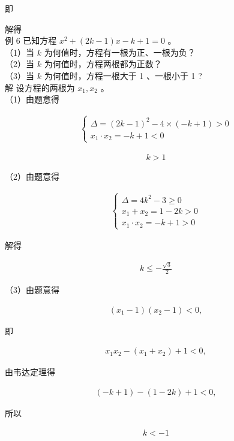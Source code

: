 \documentclass[10pt]{article}
\begin{document}
即

解得\\
例 6 已知方程 $x^{2}+(2 k-1) x-k+1=0$ 。\\
（1）当 $k$ 为何值时，方程有一根为正、一根为负？\\
（2）当 $k$ 为何值时，方程两根都为正数？\\
（3）当 $k$ 为何值时，方程一根大于 1 、一根小于 1 ?\\
解 设方程的两根为 $x_{1}, x_{2}$ 。\\
（1）由题意得

\begin{align*}
\left\{\begin{array}{l}
\Delta=(2 k-1)^{2}-4 \times(-k+1)>0 \\
x_{1} \cdot x_{2}=-k+1<0
\end{array}\right.
\end{align*}

\begin{align*}
k>1
\end{align*}

（2）由题意得

\begin{align*}
\left\{\begin{array}{l}
\Delta=4 k^{2}-3 \geqslant 0 \\
x_{1}+x_{2}=1-2 k>0 \\
x_{1} \cdot x_{2}=-k+1>0
\end{array}\right.
\end{align*}

解得

\begin{align*}
k \leqslant-\frac{\sqrt{3}}{2}
\end{align*}

（3）由题意得

\begin{align*}
\left(x_{1}-1\right)\left(x_{2}-1\right)<0,
\end{align*}

即

\begin{align*}
x_{1} x_{2}-\left(x_{1}+x_{2}\right)+1<0,
\end{align*}

由韦达定理得

\begin{align*}
(-k+1)-(1-2 k)+1<0,
\end{align*}

所以

\begin{align*}
k<-1
\end{align*}
\end{document}
